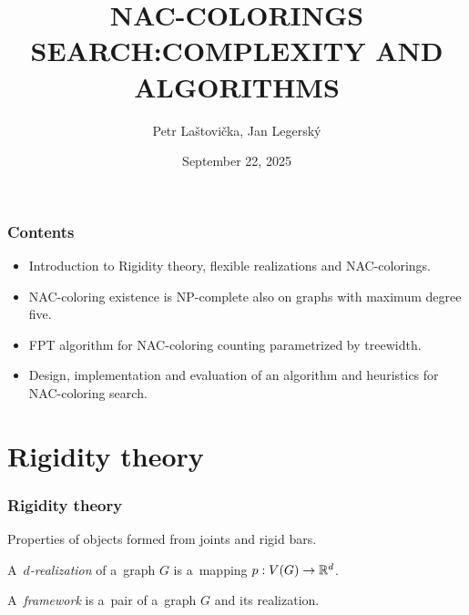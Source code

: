 \documentclass[aspectratio=\myaspectratio]{beamer}
\title{NAC-COLORINGS SEARCH\@:\newline COMPLEXITY AND ALGORITHMS}
\author{Petr Laštovička, Jan Legerský}
\institute{Czech Technical University, Faculty of Information Technology}
\date{September 22, 2025}
\begin{document}
\maketitle

\begin{frame}
	\frametitle{Contents}
	\begin{itemize}
		\item
		      Introduction to Rigidity theory, flexible realizations and NAC-colorings.
		\item
		      NAC-coloring existence is NP-complete also on graphs with maximum degree five.
		\item
		      FPT algorithm for NAC-coloring counting parametrized by treewidth.
		\item
		      Design, implementation and evaluation of an algorithm and heuristics for NAC-coloring search.
	\end{itemize}
\end{frame}

\section{Rigidity theory}

\begin{frame}
	\frametitle{Rigidity theory}

	Properties of objects formed from joints and rigid bars.

	\begin{definition}[\( d \)-realization]
		A~\emph{\( d \)-realization} of a~graph \( G \) is a~mapping \( p: V(G) \to \mathbb{R}^d \).
	\end{definition}
	\begin{definition}[Framework]
		A~\emph{framework} is a~pair of a~graph \( G \) and its realization.
	\end{definition}
\end{frame}
\end{document}
